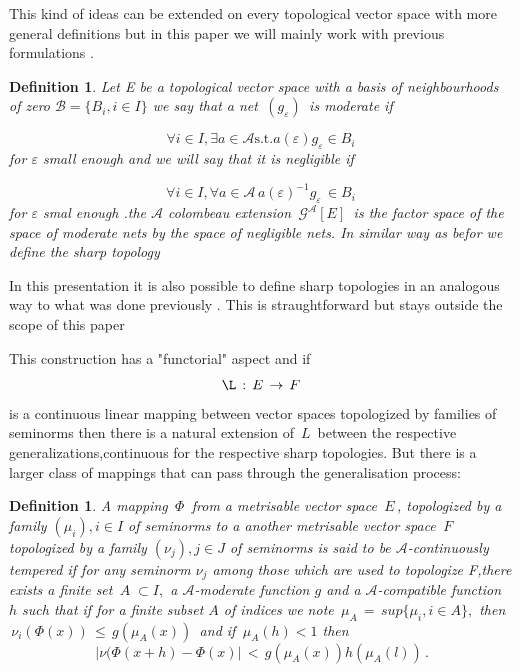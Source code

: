 \documentclass[12pt,a4paper]{amsart}
\newtheorem{definition}[theorem]{Definition}
\begin{document}
  This kind of ideas can be extended on every topological vector space with  more general definitions  but in this paper we will mainly work with previous formulations . 
  
  \begin{definition}
 Let E be a topological vector space with a basis of neighbourhoods of zero $\mathcal{B}=\{B_i, i\in I \} $ we say that a net $\, (g_\varepsilon )\,$ is moderate if 
  
   $$ \forall i\in I , \exists a \in \mathcal{A} \mbox{s.t.}
  a(\varepsilon) g_\varepsilon  \in B_i$$ for $\varepsilon$ small enough 
  and we will say that it is negligible if 
  
  $$ \forall i\in I , \forall a \in \mathcal{A}\, 
  a(\varepsilon)^{-1}g_\varepsilon \,\in B_i$$ for 
  $\varepsilon$ smal enough .the $\mathcal{A}$ colombeau extension $\, \mathcal{G}^\mathcal{A} [E] \,$ is the factor space of the space of moderate nets by the space of negligible nets. 
   In similar way as befor we define the sharp topology 
   \end{definition}
  In this presentation it is also possible to define sharp topologies in an analogous way to what was done previously . 
   This is straughtforward but stays outside the scope of this paper 
  
  
  
  
  
  
  
  
  
  
  
  
  
This construction has a "functorial" aspect and if 
$$ \L\,:\,E\,\rightarrow\,F$$ is a continuous linear mapping between vector spaces topologized by families of seminorms then there is a natural extension of $\,L\,$ between the respective generalizations,continuous for the respective sharp topologies.
  But there is a larger class of mappings that can pass through the generalisation process:
  \begin{definition}
A mapping $\,\Phi\,$ from a metrisable vector space $\,E\,$, topologized by a family $(\mu_i),i\in I$ of seminorms 
to a another metrisable vector space $\,F\,$ topologized by 
a family $(\nu_j),j\in J$ of seminorms is said to be
  $\mathcal{A}$-continuously tempered if 
for any seminorm $\nu_j$ among those which are used to topologize F,there exists a finite set $\,A\;\subset I, $  a 
$\mathcal{A}$-moderate function $ g $ and a
 $\mathcal{A}$-compatible function $h$ such that if for a finite subset $A$ of indices we  note
  $\,\mu_A \,=\,sup\{\mu_i,i\in A \},$
   then 
$\,\nu_i(\Phi(x)) \,
\leq\,g(\mu_A(x))\, $ and if 
$\,\mu_A(h)<1$ then
 $$\,|\nu(\Phi(x+h)-\Phi(x)|\,<\,g(\mu_A(x))h(\mu_A(l))\,.$$
\end{definition}
\end{document}
